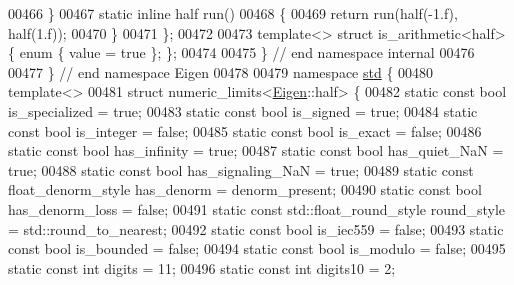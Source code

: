 \begin{DoxyCode}
00466   \}
00467   \textcolor{keyword}{static} \textcolor{keyword}{inline} half run()
00468   \{
00469     \textcolor{keywordflow}{return} run(half(-1.f), half(1.f));
00470   \}
00471 \};
00472 
00473 \textcolor{keyword}{template}<> \textcolor{keyword}{struct }is\_arithmetic<half> \{ \textcolor{keyword}{enum} \{ value = \textcolor{keyword}{true} \}; \};
00474 
00475 \} \textcolor{comment}{// end namespace internal}
00476 
00477 \}  \textcolor{comment}{// end namespace Eigen}
00478 
00479 \textcolor{keyword}{namespace }\hyperlink{namespacestd}{std} \{
00480 \textcolor{keyword}{template}<>
00481 \textcolor{keyword}{struct }numeric\_limits<\hyperlink{namespace_eigen}{Eigen}::half> \{
00482   \textcolor{keyword}{static} \textcolor{keyword}{const} \textcolor{keywordtype}{bool} is\_specialized = \textcolor{keyword}{true};
00483   \textcolor{keyword}{static} \textcolor{keyword}{const} \textcolor{keywordtype}{bool} is\_signed = \textcolor{keyword}{true};
00484   \textcolor{keyword}{static} \textcolor{keyword}{const} \textcolor{keywordtype}{bool} is\_integer = \textcolor{keyword}{false};
00485   \textcolor{keyword}{static} \textcolor{keyword}{const} \textcolor{keywordtype}{bool} is\_exact = \textcolor{keyword}{false};
00486   \textcolor{keyword}{static} \textcolor{keyword}{const} \textcolor{keywordtype}{bool} has\_infinity = \textcolor{keyword}{true};
00487   \textcolor{keyword}{static} \textcolor{keyword}{const} \textcolor{keywordtype}{bool} has\_quiet\_NaN = \textcolor{keyword}{true};
00488   \textcolor{keyword}{static} \textcolor{keyword}{const} \textcolor{keywordtype}{bool} has\_signaling\_NaN = \textcolor{keyword}{true};
00489   \textcolor{keyword}{static} \textcolor{keyword}{const} float\_denorm\_style has\_denorm = denorm\_present;
00490   \textcolor{keyword}{static} \textcolor{keyword}{const} \textcolor{keywordtype}{bool} has\_denorm\_loss = \textcolor{keyword}{false};
00491   \textcolor{keyword}{static} \textcolor{keyword}{const} std::float\_round\_style round\_style = std::round\_to\_nearest;
00492   \textcolor{keyword}{static} \textcolor{keyword}{const} \textcolor{keywordtype}{bool} is\_iec559 = \textcolor{keyword}{false};
00493   \textcolor{keyword}{static} \textcolor{keyword}{const} \textcolor{keywordtype}{bool} is\_bounded = \textcolor{keyword}{false};
00494   \textcolor{keyword}{static} \textcolor{keyword}{const} \textcolor{keywordtype}{bool} is\_modulo = \textcolor{keyword}{false};
00495   \textcolor{keyword}{static} \textcolor{keyword}{const} \textcolor{keywordtype}{int} digits = 11;
00496   \textcolor{keyword}{static} \textcolor{keyword}{const} \textcolor{keywordtype}{int} digits10 = 2;

\end{DoxyCode}

